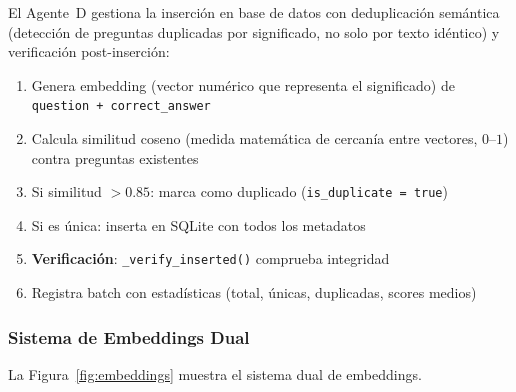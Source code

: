 \documentclass[10pt,twocolumn,letterpaper]{article}
\begin{document}
El Agente~D gestiona la inserci\'on en base de datos con deduplicaci\'on sem\'antica
(detecci\'on de preguntas duplicadas por significado, no solo por texto id\'entico)
y verificaci\'on post-inserci\'on:

\begin{enumerate}[nosep,leftmargin=*]
  \item Genera embedding (vector num\'erico que representa el significado) de
        \texttt{question + correct\_answer}
  \item Calcula similitud coseno (medida matem\'atica de cercan\'ia entre vectores, $0$--$1$)
        contra preguntas existentes
  \item Si similitud $> 0.85$: marca como duplicado (\texttt{is\_duplicate = true})
  \item Si es \'unica: inserta en SQLite con todos los metadatos
  \item \textbf{Verificaci\'on}: \texttt{\_verify\_inserted()} comprueba integridad
  \item Registra batch con estad\'isticas (total, \'unicas, duplicadas, scores medios)
\end{enumerate}

\subsubsection{Sistema de Embeddings Dual}

La Figura~\ref{fig:embeddings} muestra el sistema dual de embeddings.
\end{document}
